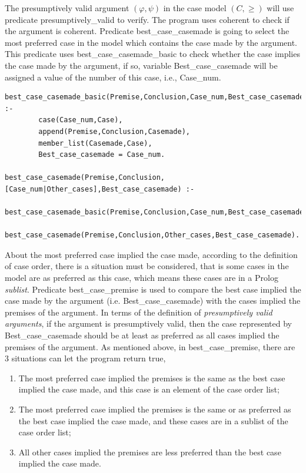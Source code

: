 \documentclass{IOS-Book-Article}
\begin{document}
The presumptively valid argument $(\varphi, \psi)$ in the case model $(C, \geq)$ will use predicate {\mf presumptively\_valid} to verify. The program uses {\mf coherent} to check if the argument is coherent. Predicate {\mf best\_case\_casemade} is going to select the most preferred case in the model which contains the case made by the argument. This predicate uses {\mf best\_case\_casemade\_basic} to check whether the case implies the case made by the argument, if so, variable {\mf Best\_case\_casemade} will be assigned a value of the number of this case, i.e., {\mf Case\_num}.
\begin{lstlisting}
best_case_casemade_basic(Premise,Conclusion,Case_num,Best_case_casemade) :-
		case(Case_num,Case),
		append(Premise,Conclusion,Casemade),
		member_list(Casemade,Case),
		Best_case_casemade = Case_num.

best_case_casemade(Premise,Conclusion,[Case_num|Other_cases],Best_case_casemade) :-
		best_case_casemade_basic(Premise,Conclusion,Case_num,Best_case_casemade);
		best_case_casemade(Premise,Conclusion,Other_cases,Best_case_casemade).
\end{lstlisting}

About the most preferred case implied the case made, according to the definition of case order, there is a situation must be considered, that is some cases in the model are as preferred as this case, which means these cases are in a Prolog \textit{sublist}. 
Predicate {\mf best\_case\_premise} is used to compare the best case implied the case made by the argument (i.e. {\mf Best\_case\_casemade}) with the cases implied the premises of the argument. In terms of the definition of \textit{presumptively valid arguments}, if the argument is presumptively valid, then the case represented by {\mf Best\_case\_casemade} should be at least as preferred as all cases implied the premises of the argument. As mentioned above, in {\mf best\_case\_premise}, there are 3 situations can let the program return {\mf true},
\begin{enumerate}
\item The most preferred case implied the premises is the same as the best case implied the case made, and this case is an element of the case order list;
\item The most preferred case implied the premises is the same or as preferred as the best case implied the case made, and these cases are in a sublist of the case order list;
\item All other cases implied the premises are less preferred than the best case implied the case made.
\end{enumerate}
\end{document}
